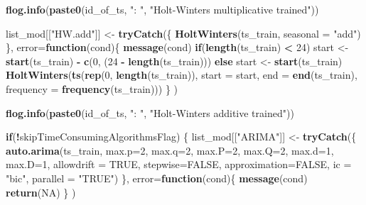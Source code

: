 \documentclass[
]{article}
\newenvironment{Shaded}{\begin{snugshade}}{\end{snugshade}}
\newcommand{\AttributeTok}[1]{\textcolor[rgb]{0.13,0.29,0.53}{#1}}
\newcommand{\ConstantTok}[1]{\textcolor[rgb]{0.56,0.35,0.01}{#1}}
\newcommand{\ControlFlowTok}[1]{\textcolor[rgb]{0.13,0.29,0.53}{\textbf{#1}}}
\newcommand{\DecValTok}[1]{\textcolor[rgb]{0.00,0.00,0.81}{#1}}
\newcommand{\FunctionTok}[1]{\textcolor[rgb]{0.13,0.29,0.53}{\textbf{#1}}}
\newcommand{\NormalTok}[1]{#1}
\newcommand{\OtherTok}[1]{\textcolor[rgb]{0.56,0.35,0.01}{#1}}
\newcommand{\SpecialCharTok}[1]{\textcolor[rgb]{0.81,0.36,0.00}{\textbf{#1}}}
\newcommand{\StringTok}[1]{\textcolor[rgb]{0.31,0.60,0.02}{#1}}
\begin{document}
\begin{Shaded}
\begin{Highlighting}[]
  \FunctionTok{flog.info}\NormalTok{(}\FunctionTok{paste0}\NormalTok{(id\_of\_ts, }\StringTok{": "}\NormalTok{, }\StringTok{"Holt{-}Winters multiplicative trained"}\NormalTok{))}

\NormalTok{  list\_mod[[}\StringTok{"HW.add"}\NormalTok{]] }\OtherTok{\textless{}{-}} \FunctionTok{tryCatch}\NormalTok{(\{}
    \FunctionTok{HoltWinters}\NormalTok{(ts\_train, }\AttributeTok{seasonal =} \StringTok{"add"}\NormalTok{)}
\NormalTok{  \},}
  \AttributeTok{error=}\ControlFlowTok{function}\NormalTok{(cond)\{}
    \FunctionTok{message}\NormalTok{(cond)}
    \ControlFlowTok{if}\NormalTok{(}\FunctionTok{length}\NormalTok{(ts\_train) }\SpecialCharTok{\textless{}} \DecValTok{24}\NormalTok{) start }\OtherTok{\textless{}{-}} \FunctionTok{start}\NormalTok{(ts\_train) }\SpecialCharTok{{-}} \FunctionTok{c}\NormalTok{(}\DecValTok{0}\NormalTok{, (}\DecValTok{24} \SpecialCharTok{{-}} \FunctionTok{length}\NormalTok{(ts\_train)))}
    \ControlFlowTok{else}\NormalTok{ start }\OtherTok{\textless{}{-}} \FunctionTok{start}\NormalTok{(ts\_train)}
    \FunctionTok{HoltWinters}\NormalTok{(}\FunctionTok{ts}\NormalTok{(}\FunctionTok{rep}\NormalTok{(}\DecValTok{0}\NormalTok{, }\FunctionTok{length}\NormalTok{(ts\_train)), }\AttributeTok{start =}\NormalTok{ start, }\AttributeTok{end =} \FunctionTok{end}\NormalTok{(ts\_train), }\AttributeTok{frequency =} \FunctionTok{frequency}\NormalTok{(ts\_train)))}
\NormalTok{  \}}
\NormalTok{  )}

  \FunctionTok{flog.info}\NormalTok{(}\FunctionTok{paste0}\NormalTok{(id\_of\_ts, }\StringTok{": "}\NormalTok{, }\StringTok{"Holt{-}Winters additive trained"}\NormalTok{))}
  
  \ControlFlowTok{if}\NormalTok{(}\SpecialCharTok{!}\NormalTok{skipTimeConsumingAlgorithmsFlag) \{}
\NormalTok{    list\_mod[[}\StringTok{"ARIMA"}\NormalTok{]] }\OtherTok{\textless{}{-}} \FunctionTok{tryCatch}\NormalTok{(\{}
      \FunctionTok{auto.arima}\NormalTok{(ts\_train, }\AttributeTok{max.p=}\DecValTok{2}\NormalTok{, }\AttributeTok{max.q=}\DecValTok{2}\NormalTok{,}
                 \AttributeTok{max.P=}\DecValTok{2}\NormalTok{, }\AttributeTok{max.Q=}\DecValTok{2}\NormalTok{, }\AttributeTok{max.d=}\DecValTok{1}\NormalTok{, }\AttributeTok{max.D=}\DecValTok{1}\NormalTok{, }\AttributeTok{allowdrift =} \ConstantTok{TRUE}\NormalTok{,}
                 \AttributeTok{stepwise=}\ConstantTok{FALSE}\NormalTok{, }\AttributeTok{approximation=}\ConstantTok{FALSE}\NormalTok{,}
                 \AttributeTok{ic =} \StringTok{"bic"}\NormalTok{,  }\AttributeTok{parallel =} \StringTok{"TRUE"}\NormalTok{)}
\NormalTok{    \},}
    \AttributeTok{error=}\ControlFlowTok{function}\NormalTok{(cond)\{}
      \FunctionTok{message}\NormalTok{(cond)}
      \FunctionTok{return}\NormalTok{(}\ConstantTok{NA}\NormalTok{)}
\NormalTok{    \}}
\NormalTok{    )}
  

\end{Highlighting}
\end{Shaded}
\end{document}
